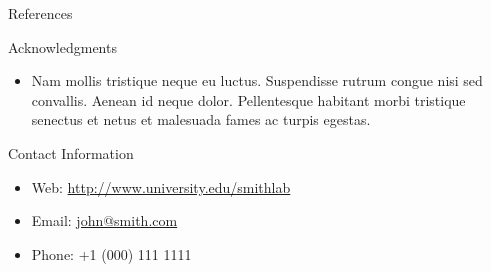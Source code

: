 \documentclass[final,hyperref={pdfpagelabels=false}]{beamer}
\begin{document}
\begin{frame}[t]
\begin{columns}[t]
\begin{column}{.32\textwidth}
\begin{block}{References}
  \end{block}


  \begin{block}{Acknowledgments}

    \begin{itemize}
    \item Nam mollis tristique neque eu luctus. Suspendisse rutrum
      congue nisi sed convallis. Aenean id neque dolor. Pellentesque
      habitant morbi tristique senectus et netus et malesuada fames ac
      turpis egestas.
    \end{itemize}

  \end{block}



  \begin{block}{Contact Information}

    \begin{itemize}
    \item Web:
      \href{http://www.university.edu/smithlab}{http://www.university.edu/smithlab}
    \item Email: \href{mailto:john@smith.com}{john@smith.com}
    \item Phone: +1 (000) 111 1111
    \end{itemize}

  \end{block}


\end{column} %

\begin{column}{.015\textwidth}\end{column} %

\end{columns} %

\end{frame} %

\end{document}
